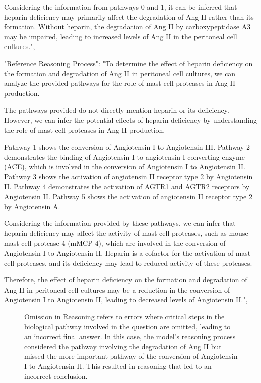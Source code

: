 \begin{tcolorbox}[breakable]
Considering the information from pathways 0 and 1, it can be inferred that heparin deficiency may primarily affect the degradation of Ang II rather than its formation. Without heparin, the degradation of Ang II by carboxypeptidase A3 may be impaired, leading to increased levels of Ang II in the peritoneal cell cultures.",



"Reference Reasoning Process": "To determine the effect of heparin deficiency on the formation and degradation of Ang II in peritoneal cell cultures, we can analyze the provided pathways for the role of mast cell proteases in Ang II production.

The pathways provided do not directly mention heparin or its deficiency. However, we can infer the potential effects of heparin deficiency by understanding the role of mast cell proteases in Ang II production.

Pathway 1 shows the conversion of Angiotensin I to Angiotensin III. Pathway 2 demonstrates the binding of Angiotensin I to angiotensin I converting enzyme (ACE), which is involved in the conversion of Angiotensin I to Angiotensin II. Pathway 3 shows the activation of angiotensin II receptor type 2 by Angiotensin II. Pathway 4 demonstrates the activation of AGTR1 and AGTR2 receptors by Angiotensin II. Pathway 5 shows the activation of angiotensin II receptor type 2 by Angiotensin A.

Considering the information provided by these pathways, we can infer that heparin deficiency may affect the activity of mast cell proteases, such as mouse mast cell protease 4 (mMCP-4), which are involved in the conversion of Angiotensin I to Angiotensin II. Heparin is a cofactor for the activation of mast cell proteases, and its deficiency may lead to reduced activity of these proteases.

Therefore, the effect of heparin deficiency on the formation and degradation of Ang II in peritoneal cell cultures may be a reduction in the conversion of Angiotensin I to Angiotensin II, leading to decreased levels of Angiotensin II.",
\end{tcolorbox}
\begin{figure}[!h]
    \vspace{0.01cm}
    \caption{Omission in Reasoning refers to errors where critical steps in the biological pathway involved in the question are omitted, leading to an incorrect final answer. In this case, the model's reasoning process considered the pathway involving the degradation of Ang II but missed the more important pathway of the conversion of Angiotensin I to Angiotensin II. This resulted in reasoning that led to an incorrect conclusion. }
\end{figure}


